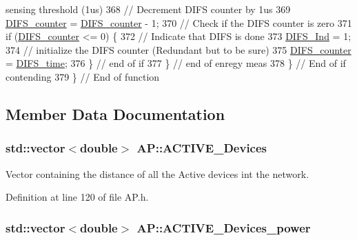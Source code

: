 \begin{DoxyCode}
{       sensing threshold (1us)}
368             \textcolor{comment}{// Decrement DIFS counter by 1us}
369             \hyperlink{classAP_ae8b5098c1fed76aeecdb1ed35f8952a1}{DIFS\_counter} = \hyperlink{classAP_ae8b5098c1fed76aeecdb1ed35f8952a1}{DIFS\_counter} - 1;
370             \textcolor{comment}{// Check if the DIFS counter is zero}
371             \textcolor{keywordflow}{if} (\hyperlink{classAP_ae8b5098c1fed76aeecdb1ed35f8952a1}{DIFS\_counter} <= 0) \{
372                 \textcolor{comment}{// Indicate that DIFS is done}
373                 \hyperlink{classAP_ae9749297d96e52a95a4f52f795127f8e}{DIFS\_Ind} = 1;
374                 \textcolor{comment}{// initialize the DIFS counter (Redundant but to be sure)}
375                 \hyperlink{classAP_ae8b5098c1fed76aeecdb1ed35f8952a1}{DIFS\_counter} = \hyperlink{classAP_a41453568719c530c6a7376273c02a6fa}{DIFS\_time};
376             \} \textcolor{comment}{// end of if}
377         \} \textcolor{comment}{// end of enregy meas}
378     \} \textcolor{comment}{// End of if contending}
379 \} \textcolor{comment}{// End of function}
\end{DoxyCode}


\subsection{Member Data Documentation}
\hypertarget{classAP_ab6dd8d2144b1be8dea239c3d76fc60cd}{
\subsubsection[{A\-C\-T\-I\-V\-E\-\_\-\-Devices}]{\setlength{\rightskip}{0pt plus 5cm}std\-::vector$<$double$>$ A\-P\-::\-A\-C\-T\-I\-V\-E\-\_\-\-Devices}}\label{classAP_ab6dd8d2144b1be8dea239c3d76fc60cd}


Vector containing the distance of all the Active devices int the network. 



Definition at line 120 of file A\-P.\-h.

\hypertarget{classAP_ad666997cd964596ea69b7ed750fadcfa}{
\subsubsection[{A\-C\-T\-I\-V\-E\-\_\-\-Devices\-\_\-power}]{\setlength{\rightskip}{0pt plus 5cm}std\-::vector$<$double$>$ A\-P\-::\-A\-C\-T\-I\-V\-E\-\_\-\-Devices\-\_\-power}}\label{classAP_ad666997cd964596ea69b7ed750fadcfa}


